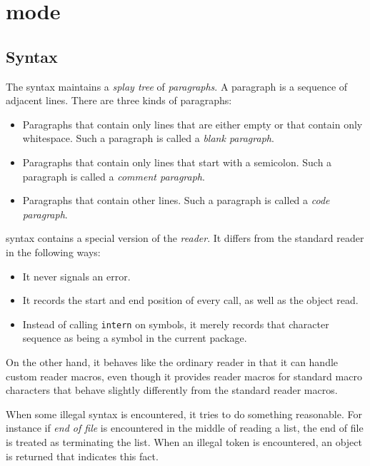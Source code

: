 \chapter{\cl{} mode}
\label{chap-internals-common-lisp-mode}

\section{Syntax}

The \cl{} syntax maintains a \emph{splay tree}
\cite{Sleator:1985:SBS:3828.3835} of \emph{paragraphs}.  A paragraph
is a sequence of adjacent lines. There are three kinds of paragraphs:

\begin{itemize}
\item Paragraphs that contain only lines that are either empty or
  that contain only whitespace.  Such a paragraph is called a
  \emph{blank paragraph}. 
\item Paragraphs that contain only lines that start with a semicolon.
  Such a paragraph is called a \emph{comment paragraph}.
\item Paragraphs that contain other lines.  Such a paragraph is called
  a \emph{code paragraph}.
\end{itemize}

\cl{} syntax contains a special version of the \cl{} \emph{reader}.
It differs from the standard reader in the following ways:

\begin{itemize}
\item It never signals an error.
\item It records the start and end position of every call, as well as
  the object read.
\item Instead of calling \texttt{intern} on symbols, it merely records
  that character sequence as being a symbol in the current package. 
\end{itemize}

On the other hand, it behaves like the ordinary \cl{} reader in that
it can handle custom reader macros, even though it provides reader
macros for standard macro characters that behave slightly differently
from the standard reader macros. 

When some illegal syntax is encountered, it tries to do something
reasonable.  For instance if \emph{end of file} is encountered in the
middle of reading a list, the end of file is treated as terminating
the list.  When an illegal token is encountered, an object is returned
that indicates this fact. 


